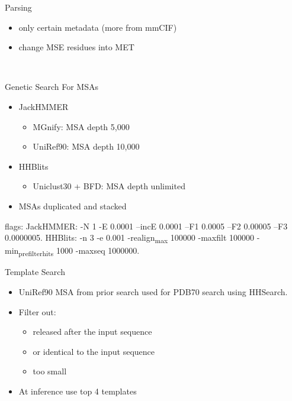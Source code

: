 \documentclass[presentation, smaller]{beamer}
\begin{document}
\begin{frame}[label={sec:org15116e8}]{Parsing}
  \begin{itemize}
  \item only certain metadata (more from mmCIF)
  \item change MSE residues into MET
  \end{itemize}~\cite{jumperHighlyAccurateProtein2021}
\end{frame}

\begin{frame}[label={sec:orge64af38}]{Genetic Search}
  For MSAs
  \begin{itemize}
  \item JackHMMER
    \begin{itemize}
    \item MGnify: MSA depth 5,000
    \item UniRef90: MSA depth 10,000
    \end{itemize}
  \item HHBlits
    \begin{itemize}
    \item Uniclust30 + BFD: MSA depth unlimited
    \end{itemize}
  \item MSAs duplicated and stacked
  \end{itemize}
  
  flags:
  JackHMMER: -N 1 -E 0.0001 --incE 0.0001 --F1 0.0005 --F2 0.00005 --F3 0.0000005.
  HHBlits: -n 3 -e 0.001 -realign\textsubscript{max} 100000 -maxfilt 100000 -min\textsubscript{prefilter}\textsubscript{hits} 1000 -maxseq 1000000.~\cite{jumperHighlyAccurateProtein2021}
\end{frame}


\begin{frame}[label={sec:org6c39bdf}]{Template Search}
  \begin{itemize}
  \item UniRef90 MSA from prior search used for PDB70 search using HHSearch.
  \item Filter out:
    \begin{itemize}
    \item released after the input sequence
    \item or identical to the input sequence
    \item too small
    \end{itemize}
  \item At inference use top 4 templates
  \end{itemize}~\cite{jumperHighlyAccurateProtein2021}
\end{frame}
\end{document}
